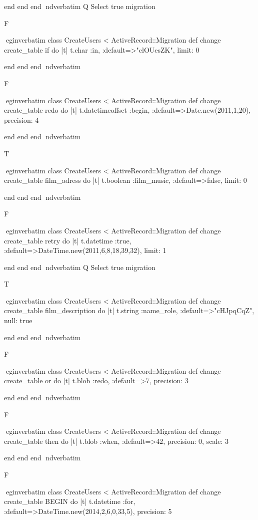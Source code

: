    end 
  end 
end
nd{verbatim}
Q
 Select true migration

F

egin{verbatim}
 class CreateUsers < ActiveRecord::Migration 
  def change 
    create_table if do |t| 
      t.char :in, :default=>"clOUesZK", limit: 0
    
    end 
  end 
end
nd{verbatim}

F

egin{verbatim}
 class CreateUsers < ActiveRecord::Migration 
  def change 
    create_table redo do |t| 
      t.datetimeoffset :begin, :default=>Date.new(2011,1,20), precision: 4
    
    end 
  end 
end
nd{verbatim}

T

egin{verbatim}
 class CreateUsers < ActiveRecord::Migration 
  def change 
    create_table film_adress do |t| 
      t.boolean :film_music, :default=>false, limit: 0
    
    end 
  end 
end
nd{verbatim}

F

egin{verbatim}
 class CreateUsers < ActiveRecord::Migration 
  def change 
    create_table retry do |t| 
      t.datetime :true, :default=>DateTime.new(2011,6,8,18,39,32), limit: 1
    
    end 
  end 
end
nd{verbatim}
Q
 Select true migration

T

egin{verbatim}
 class CreateUsers < ActiveRecord::Migration 
  def change 
    create_table film_description do |t| 
      t.string :name_role, :default=>"cHJpqCqZ", null: true
    
    end 
  end 
end
nd{verbatim}

F

egin{verbatim}
 class CreateUsers < ActiveRecord::Migration 
  def change 
    create_table or do |t| 
      t.blob :redo, :default=>7, precision: 3
    
    end 
  end 
end
nd{verbatim}

F

egin{verbatim}
 class CreateUsers < ActiveRecord::Migration 
  def change 
    create_table then do |t| 
      t.blob :when, :default=>42, precision: 0, scale: 3
    
    end 
  end 
end
nd{verbatim}

F

egin{verbatim}
 class CreateUsers < ActiveRecord::Migration 
  def change 
    create_table BEGIN do |t| 
      t.datetime :for, :default=>DateTime.new(2014,2,6,0,33,5), precision: 5
    
